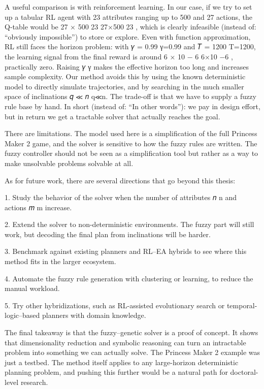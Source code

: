 \documentclass[12pt, a4paper]{report}
\begin{document}
	A useful comparison is with reinforcement learning. In our case, if we try to set up a tabular RL agent with 23 attributes ranging up to 500 and 27 actions, the Q-table would be 
	27
	×
	500
	23
	27×500
	23
	, which is clearly infeasible (instead of: “obviously impossible”) to store or explore. Even with function approximation, RL still faces the horizon problem: with 
	𝛾
	=
	0.99
	γ=0.99 and 
	𝑇
	=
	1200
	T=1200, the learning signal from the final reward is around 
	6
	×
	10
	−
	6
	6×10
	−6
	, practically zero. Raising 
	𝛾
	γ makes the effective horizon too long and increases sample complexity. Our method avoids this by using the known deterministic model to directly simulate trajectories, and by searching in the much smaller space of inclinations 
	𝑞
	≪
	𝑛
	q≪n. The trade-off is that we have to supply a fuzzy rule base by hand. In short (instead of: “In other words”): we pay in design effort, but in return we get a tractable solver that actually reaches the goal.
	
	There are limitations. The model used here is a simplification of the full Princess Maker 2 game, and the solver is sensitive to how the fuzzy rules are written. The fuzzy controller should not be seen as a simplification tool but rather as a way to make unsolvable problems solvable at all.
	
	As for future work, there are several directions that go beyond this thesis:
	
	1. Study the behavior of the solver when the number of attributes 
	𝑛
	n and actions 
	𝑚
	m increase.
	
	2. Extend the solver to non-deterministic environments. The fuzzy part will still work, but decoding the final plan from inclinations will be harder.
	
	3. Benchmark against existing planners and RL–EA hybrids to see where this method fits in the larger ecosystem.
	
	4. Automate the fuzzy rule generation with clustering or learning, to reduce the manual workload.
	
	5. Try other hybridizations, such as RL-assisted evolutionary search or temporal-logic–based planners with domain knowledge.
	
	The final takeaway is that the fuzzy–genetic solver is a proof of concept. It shows that dimensionality reduction and symbolic reasoning can turn an intractable problem into something we can actually solve. The Princess Maker 2 example was just a testbed. The method itself applies to any large-horizon deterministic planning problem, and pushing this further would be a natural path for doctoral-level research.
	
\end{document}
